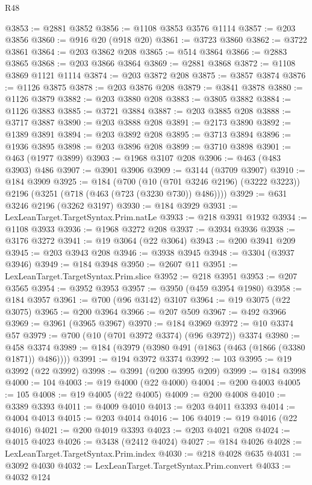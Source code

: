 \begin{lexlean}{R48}
\begin{coremodule}
@3853 := @2881 @3852
@3856 := @1108 @3853 @3576 @1114
@3857 := @203 @3856
@3860 := @916 @20 (@918 @20)
@3861 := @3723 @3860
@3862 := @3722 @3861
@3864 := @203 @3862 @208
@3865 := @514 @3864
@3866 := @2883 @3865
@3868 := @203 @3866 @3864
@3869 := @2881 @3868
@3872 := @1108 @3869 @1121 @1114
@3874 := @203 @3872 @208
@3875 := @3857 @3874
@3876 := @1126 @3875
@3878 := @203 @3876 @208
@3879 := @3841 @3878
@3880 := @1126 @3879
@3882 := @203 @3880 @208
@3883 := @3805 @3882
@3884 := @1126 @3883
@3885 := @3721 @3884
@3887 := @203 @3885 @208
@3888 := @3717 @3887
@3890 := @203 @3888 @208
@3891 := @2173 @3890
@3892 := @1389 @3891
@3894 := @203 @3892 @208
@3895 := @3713 @3894
@3896 := @1936 @3895
@3898 := @203 @3896 @208
@3899 := @3710 @3898
@3901 := @463 (@1977 @3899)
@3903 := @1968 @3107 @208
@3906 := @463 (@483 @3903) @486
@3907 := @3901 @3906
@3909 := @3144 (@3709 @3907)
@3910 := @184 @3909
@3925 := @184
    (@700
      (@10 (@701 @3246 @2196) (@3222 @3223))
      @2196
      (@3251 (@718 (@463 (@723 (@3230 @730)) @486))))
@3929 := @631 @3246 @2196 (@3262 @3197)
@3930 := @184 @3929
@3931 := LexLeanTarget.TargetSyntax.Prim.natLe
@3933 := @218 @3931 @1932
@3934 := @1108 @3933
@3936 := @1968 @3272 @208
@3937 := @3934 @3936
@3938 := @3176 @3272
@3941 := @19 @3064 (@22 @3064)
@3943 := @200 @3941 @209
@3945 := @203 @3943 @208
@3946 := @3938 @3945
@3948 := @3304 (@3937 @3946)
@3949 := @184 @3948
@3950 := @2607 @11
@3951 := LexLeanTarget.TargetSyntax.Prim.slice
@3952 := @218 @3951
@3953 := @207 @3565
@3954 := @3952 @3953
@3957 := @3950 (@459 @3954 @1980)
@3958 := @184 @3957
@3961 := @700 (@96 @3142) @3107
@3964 := @19 @3075 (@22 @3075)
@3965 := @200 @3964
@3966 := @207 @509
@3967 := @492 @3966
@3969 := @3961 (@3965 @3967)
@3970 := @184 @3969
@3972 := @10 @3374 @57
@3979 := @700 (@10 (@701 @3972 @3374) (@96 @3972)) @3374
@3980 := @458 @3374
@3989 := @184 (@3979 (@3980 @491 (@1863 (@463 (@1866 (@3380 @1871)) @486))))
@3991 := @194 @3972 @3374
@3992 := 103
@3995 := @19 @3992 (@22 @3992)
@3998 := @3991 (@200 @3995 @209)
@3999 := @184 @3998
@4000 := 104
@4003 := @19 @4000 (@22 @4000)
@4004 := @200 @4003
@4005 := 105
@4008 := @19 @4005 (@22 @4005)
@4009 := @200 @4008
@4010 := @3389 @3393
@4011 := @4009 @4010
@4013 := @203 @4011 @3393
@4014 := @4004 @4013
@4015 := @203 @4014
@4016 := 106
@4019 := @19 @4016 (@22 @4016)
@4021 := @200 @4019 @3393
@4023 := @203 @4021 @208
@4024 := @4015 @4023
@4026 := @3438 (@2412 @4024)
@4027 := @184 @4026
@4028 := LexLeanTarget.TargetSyntax.Prim.index
@4030 := @218 @4028 @635
@4031 := @3092 @4030
@4032 := LexLeanTarget.TargetSyntax.Prim.convert
@4033 := @4032 @124

\end{coremodule}
\end{lexlean}
